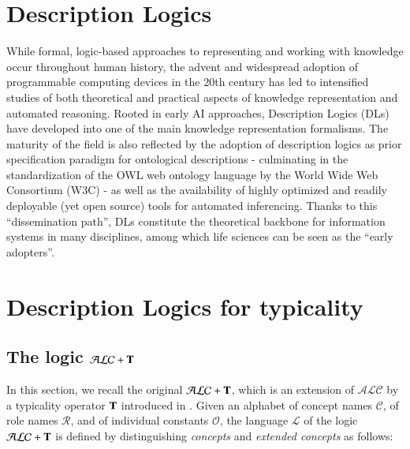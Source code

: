 \documentclass[a4paper, 11pt, oneside]{elsarticle}
\newcommand{\tip}{{\bf T}}
\newcommand{\alc}{\mathcal{ALC}}
\newcommand{\alct}{\mathcal{ALC}+\tip}
\newcommand{\elle} {\mathcal{L}}
\begin{document}

\section{Description Logics}

While formal, logic-based approaches to representing and working with knowledge occur throughout human history, the advent and widespread adoption of programmable computing devices in the 20th century has led to intensified studies of both theoretical and practical aspects of knowledge representation and automated reasoning.
Rooted in early AI approaches, Description Logics (DLs) have developed into one of the main knowledge representation formalisms.
The maturity of the field is also reflected by the adoption of description logics as prior specification paradigm for ontological descriptions - culminating in the standardization of the OWL web ontology language by the World Wide Web Consortium (W3C) - as well as the availability of highly optimized and readily deployable (yet open source) tools for automated inferencing.
Thanks to this ``dissemination path'', DLs constitute the theoretical backbone for information systems in many disciplines, among which life sciences can be seen as the ``early adopters''\cite{Sidhu05proteinontology, Golbreich:2006:FMA:1222219.1222304, Wolstencroft:2005:LSW:2079844.2079902}.


\section{Description Logics for typicality}

\subsection{The logic $\alct$}\label{alct}


In this section, we recall the original $\alct$, which is an extension of $\alc$ by a typicality operator $\tip$ introduced in \cite{FI09}. Given an alphabet of concept names $\mathcal{C}$, of role names $\mathcal{R}$, and of individual constants $\mathcal{O}$, the language $\elle$ of the logic $\alct$ is defined by distinguishing \emph{concepts} and \emph{extended concepts} as follows:
\end{document}
